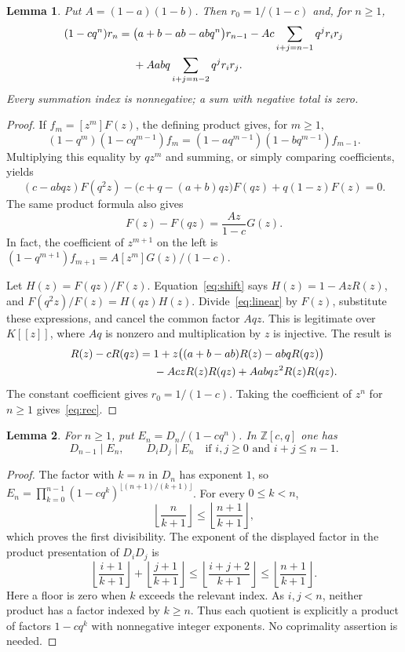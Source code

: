 \documentclass[11pt]{article}
\newtheorem{lemma}{Lemma}
\newcommand{\Z}{\mathbb Z}
\begin{document}
\begin{lemma}\label{lem:rec}
Put $A=(1-a)(1-b)$. Then $r_0=1/(1-c)$ and, for $n\geq1$,
\begin{align}
 (1-cq^n)r_n={}&\bigl(a+b-ab-abq^n\bigr)r_{n-1}
 -Ac\sum_{i+j=n-1}q^j r_i r_j\notag\\
 &+Aabq\sum_{i+j=n-2}q^j r_i r_j .\label{eq:rec}
\end{align}
Every summation index is nonnegative; a sum with negative total is zero.
\end{lemma}
\begin{proof}
If $f_m=[z^m]F(z)$, the defining product gives, for $m\geq1$,
\[
 (1-q^m)(1-cq^{m-1})f_m
 =(1-aq^{m-1})(1-bq^{m-1})f_{m-1}.
\]
Multiplying this equality by $qz^m$ and summing, or simply comparing
coefficients, yields
\begin{equation}
 (c-abqz)F(q^2z)-\bigl(c+q-(a+b)qz\bigr)F(qz)
       +q(1-z)F(z)=0.\label{eq:linear}
\end{equation}
The same product formula also gives
\begin{equation}
 F(z)-F(qz)=\frac{Az}{1-c}G(z).\label{eq:shift}
\end{equation}
In fact, the coefficient of $z^{m+1}$ on the left is
$(1-q^{m+1})f_{m+1}=A[z^m]G(z)/(1-c)$.

Let $H(z)=F(qz)/F(z)$. Equation~\eqref{eq:shift} says
$H(z)=1-AzR(z)$, and $F(q^2z)/F(z)=H(qz)H(z)$.
Divide~\eqref{eq:linear} by $F(z)$, substitute these expressions,
and cancel the common factor $Aqz$. This is legitimate over $K[[z]]$,
where $Aq$ is nonzero and multiplication by $z$ is injective. The result is
\begin{align}
 R(z)-cR(qz)={}&1+z\bigl((a+b-ab)R(z)-abqR(qz)\bigr)\notag\\
 &-AczR(z)R(qz)+Aabqz^2R(z)R(qz).\label{eq:riccati}
\end{align}
The constant coefficient gives $r_0=1/(1-c)$. Taking the coefficient of
$z^n$ for $n\geq1$ gives~\eqref{eq:rec}.
\end{proof}

\begin{lemma}\label{lem:den}
For $n\geq1$, put $E_n=D_n/(1-cq^n)$. In $\Z[c,q]$ one has
\[
 D_{n-1}\mid E_n,
 \qquad D_iD_j\mid E_n\quad\text{if }i,j\geq0\text{ and }i+j\leq n-1.
\]
\end{lemma}
\begin{proof}
The factor with $k=n$ in $D_n$ has exponent $1$, so
$E_n=\prod_{k=0}^{n-1}(1-cq^k)^{\lfloor(n+1)/(k+1)\rfloor}$.
For every $0\leq k<n$,
\[
 \left\lfloor\frac{n}{k+1}\right\rfloor
 \leq\left\lfloor\frac{n+1}{k+1}\right\rfloor,
\]
which proves the first divisibility. The exponent of the displayed factor
in the product presentation of $D_iD_j$ is
\[
 \left\lfloor\frac{i+1}{k+1}\right\rfloor+
 \left\lfloor\frac{j+1}{k+1}\right\rfloor
 \leq\left\lfloor\frac{i+j+2}{k+1}\right\rfloor
 \leq\left\lfloor\frac{n+1}{k+1}\right\rfloor.
\]
Here a floor is zero when $k$ exceeds the relevant index. As $i,j<n$,
neither product has a factor indexed by $k\geq n$. Thus each quotient is
explicitly a product of factors $1-cq^k$ with nonnegative integer exponents.
No coprimality assertion is needed.
\end{proof}
\end{document}
